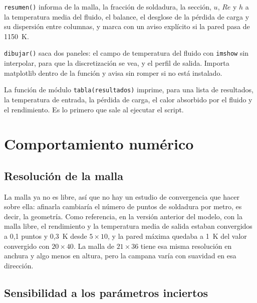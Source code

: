 \documentclass[11pt,a4paper]{article}
\begin{document}
\texttt{resumen()} informa de la malla, la fracción de soldadura, la sección, $u$,
$Re$ y $h$ a la temperatura media del fluido, el balance, el desglose de la
pérdida de carga y su dispersión entre columnas, y marca con un aviso explícito
si la pared pasa de 1150~K.

\texttt{dibujar()} saca dos paneles: el campo de temperatura del fluido con
\texttt{imshow} sin interpolar, para que la discretización se vea, y el perfil
de salida. Importa matplotlib dentro de la función y avisa sin romper si no está
instalado.

La función de módulo \texttt{tabla(resultados)} imprime, para una lista de
resultados, la temperatura de entrada, la pérdida de carga, el calor absorbido
por el fluido y el rendimiento. Es lo primero que sale al ejecutar el script.

\section{Comportamiento numérico}

\subsection{Resolución de la malla}

La malla ya no es libre, así que no hay un estudio de convergencia que hacer
sobre ella: afinarla cambiaría el número de puntos de soldadura por metro, es
decir, la geometría. Como referencia, en la versión anterior del modelo, con la
malla libre, el rendimiento y la temperatura media de salida estaban
convergidos a 0,1 puntos y 0,3~K desde $5\times10$, y la pared máxima quedaba a
1~K del valor convergido con $20\times40$. La malla de $21\times36$ tiene esa
misma resolución en anchura y algo menos en altura, pero la campana varía con
suavidad en esa dirección.

\subsection{Sensibilidad a los parámetros inciertos}
\end{document}
